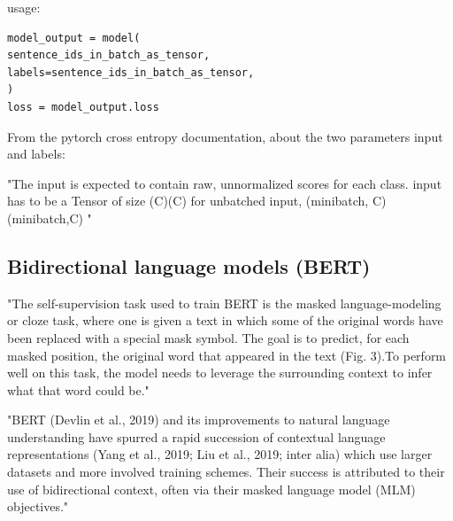 usage:
\begin{lstlisting}
model_output = model(
sentence_ids_in_batch_as_tensor,
labels=sentence_ids_in_batch_as_tensor,
)
loss = model_output.loss
\end{lstlisting}

From the pytorch cross entropy documentation, about the two parameters input and labels:

"The input is expected to contain raw, unnormalized scores for each class. input has to be a Tensor of size (C)(C) for unbatched input, (minibatch, C)(minibatch,C) "



\pagebreak

\subsection{Bidirectional language models (BERT)}

"The self-supervision task used to train BERT is the masked language-modeling  or  cloze  task,  where  one  is  given  a  text  in which  some  of  the  original  words  have  been  replaced  with  a special  mask  symbol.  The  goal  is  to  predict,  for  each  masked position,  the  original  word  that  appeared  in  the  text  (Fig.  3).To perform well on this task, the model needs to leverage the surrounding context to infer what that word could be." \citep{manning2020emergent}

"BERT (Devlin et al., 2019) and its improvements to natural language understanding have spurred a rapid succession of contextual language representations (Yang et al., 2019; Liu et al., 2019; inter alia) which use larger datasets and more involved training schemes. Their success is attributed to their use of bidirectional context, often via their masked language model (MLM) objectives." \citet{salazar2020masked}



